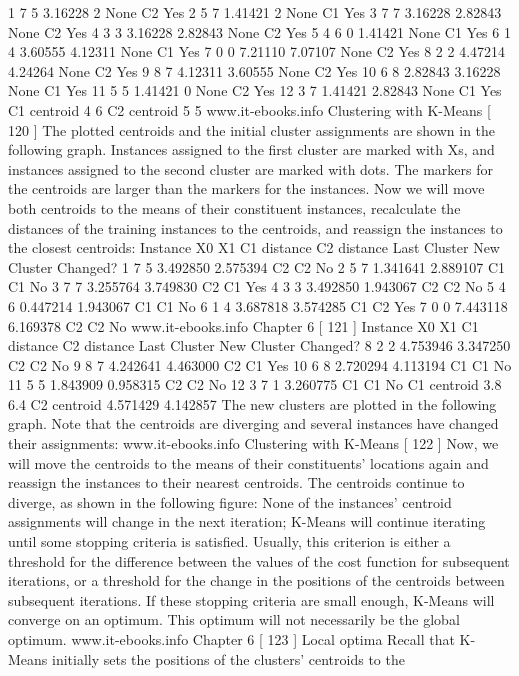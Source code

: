 1 7 5 3.16228 2 None C2 Yes
2 5 7 1.41421 2 None C1 Yes
3 7 7 3.16228 2.82843 None C2 Yes
4 3 3 3.16228 2.82843 None C2 Yes
5 4 6 0 1.41421 None C1 Yes
6 1 4 3.60555 4.12311 None C1 Yes
7 0 0 7.21110 7.07107 None C2 Yes
8 2 2 4.47214 4.24264 None C2 Yes
9 8 7 4.12311 3.60555 None C2 Yes
10 6 8 2.82843 3.16228 None C1 Yes
11 5 5 1.41421 0 None C2 Yes
12 3 7 1.41421 2.82843 None C1 Yes
C1 centroid 4 6
C2 centroid 5 5
www.it-ebooks.info
Clustering with K-Means
[ 120 ]
The plotted centroids and the initial cluster assignments are shown in the following
graph. Instances assigned to the first cluster are marked with Xs, and instances
assigned to the second cluster are marked with dots. The markers for the centroids
are larger than the markers for the instances.
Now we will move both centroids to the means of their constituent instances,
recalculate the distances of the training instances to the centroids, and reassign the
instances to the closest centroids:
Instance X0 X1 C1
distance
C2
distance
Last
Cluster
New
Cluster Changed?
1 7 5 3.492850 2.575394 C2 C2 No
2 5 7 1.341641 2.889107 C1 C1 No
3 7 7 3.255764 3.749830 C2 C1 Yes
4 3 3 3.492850 1.943067 C2 C2 No
5 4 6 0.447214 1.943067 C1 C1 No
6 1 4 3.687818 3.574285 C1 C2 Yes
7 0 0 7.443118 6.169378 C2 C2 No
www.it-ebooks.info
Chapter 6
[ 121 ]
Instance X0 X1 C1
distance
C2
distance
Last
Cluster
New
Cluster Changed?
8 2 2 4.753946 3.347250 C2 C2 No
9 8 7 4.242641 4.463000 C2 C1 Yes
10 6 8 2.720294 4.113194 C1 C1 No
11 5 5 1.843909 0.958315 C2 C2 No
12 3 7 1 3.260775 C1 C1 No
C1
centroid 3.8 6.4
C2
centroid 4.571429 4.142857
The new clusters are plotted in the following graph. Note that the centroids are
diverging and several instances have changed their assignments:
www.it-ebooks.info
Clustering with K-Means
[ 122 ]
Now, we will move the centroids to the means of their constituents' locations again
and reassign the instances to their nearest centroids. The centroids continue to
diverge, as shown in the following figure:
None of the instances' centroid assignments will change in the next iteration;
K-Means will continue iterating until some stopping criteria is satisfied. Usually,
this criterion is either a threshold for the difference between the values of the cost
function for subsequent iterations, or a threshold for the change in the positions
of the centroids between subsequent iterations. If these stopping criteria are small
enough, K-Means will converge on an optimum. This optimum will not necessarily
be the global optimum.
www.it-ebooks.info
Chapter 6
[ 123 ]
Local optima
Recall that K-Means initially sets the positions of the clusters' centroids to the
